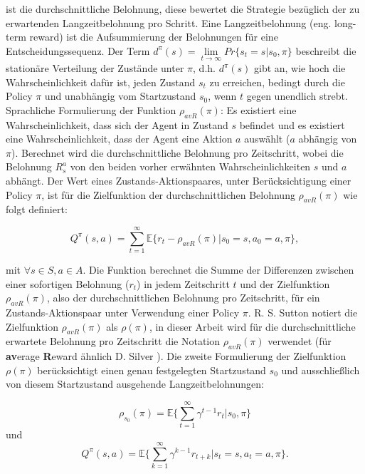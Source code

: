 \documentclass[conference]{IEEEtran}
\begin{document}
ist die durchschnittliche Belohnung, diese bewertet die Strategie bezüglich der zu erwartenden Langzeitbelohnung pro Schritt. Eine Langzeitbelohnung (eng. long-term reward) ist die Aufsummierung der Belohnungen für eine Entscheidungssequenz. Der Term $d^\pi(s) = \lim\limits_{t \rightarrow \infty} Pr\{s_t = s|s_0,\pi\}$ beschreibt die stationäre Verteilung der Zustände unter $\pi$, d.h. $d^\pi(s)$ gibt an, wie hoch die Wahrscheinlichkeit dafür ist, jeden Zustand $s_t$ zu erreichen, bedingt durch die Policy $\pi$ und unabhängig vom Startzustand $s_0$, wenn $t$ gegen unendlich strebt. Sprachliche Formulierung der Funktion $\rho_{avR}(\pi)$: Es existiert eine Wahrscheinlichkeit, dass sich der Agent in Zustand $s$ befindet und es existiert eine Wahrscheinlichkeit, dass der Agent eine Aktion $a$ auswählt ($a$ abhängig von $\pi$). Berechnet wird die durchschnittliche Belohnung pro Zeitschritt, wobei die Belohnung $R^a_s$ von den beiden vorher erwähnten Wahrscheinlichkeiten $s$ und $a$ abhängt. Der Wert eines Zustands-Aktionspaares, unter Berücksichtigung einer Policy $\pi$, ist für die Zielfunktion der durchschnittlichen Belohnung $\rho_{avR}(\pi)$ wie folgt definiert:

\begin{equation*}
Q^\pi(s,a) = \sum^\infty_{t=1} \mathbb{E}\{r_t - \rho_{avR}(\pi)|s_0 = s, a_0 = a, \pi\},
\end{equation*}

mit $\forall s \in S, a \in A$. Die Funktion berechnet die Summe der Differenzen zwischen einer sofortigen Belohnung ($r_t$) in jedem Zeitschritt $t$ und der Zielfunktion $\rho_{avR}(\pi)$, also der durchschnittlichen Belohnung pro Zeitschritt, für ein Zustands-Aktionspaar unter Verwendung einer Policy $\pi$. R. S. Sutton notiert die Zielfunktion $\rho_{avR}(\pi)$ als $\rho(\pi)$, in dieser Arbeit wird für die durchschnittliche erwartete Belohnung pro Zeitschritt die Notation $\rho_{avR}(\pi)$ verwendet (für \textbf{av}erage \textbf{R}eward ähnlich D. Silver \cite{silver_15}). Die zweite Formulierung der Zielfunktion $\rho(\pi)$ berücksichtigt einen genau festgelegten Startzustand $s_0$ und ausschließlich von diesem Startzustand ausgehende Langzeitbelohnungen:

\begin{equation*}
\rho_{s_0}(\pi) = \mathbb{E}\{\sum^\infty_{t=1} \gamma^{t-1} r_t | s_0,\pi \}
\end{equation*}
und
\begin{equation*}
Q^\pi (s,a) = \mathbb{E} \{\sum^\infty_{k=1} \gamma^{k-1} r_{t+k} | s_t = s, a_t = a, \pi\}.
\end{equation*}
\end{document}
